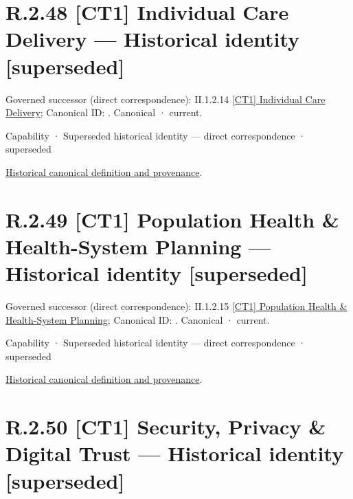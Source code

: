 \section*{R.2.48 [CT1] Individual Care Delivery — Historical identity [superseded]}
\label{navigation:R.2.48}

{\small Governed successor (direct correspondence): II.1.2.14 \hyperref[element:b964a11cde594318aa14ff935414158a]{[CT1] Individual Care Delivery}; Canonical ID: \texttt{}. Canonical · current.}\par
\label{element:162deb7e292042f78f677a14476a3a1d}
{\small Capability · Superseded historical identity — direct correspondence · superseded}\par
\href{../../../../continuum/strategy/capability/162deb7e292042f78f677a14476a3a1d.md}{Historical canonical definition and provenance}.\par
\section*{R.2.49 [CT1] Population Health \& Health-System Planning — Historical identity [superseded]}
\label{navigation:R.2.49}

{\small Governed successor (direct correspondence): II.1.2.15 \hyperref[element:c63b38b37e9b4e9b97dc87ed54604def]{[CT1] Population Health \& Health-System Planning}; Canonical ID: \texttt{}. Canonical · current.}\par
\label{element:a5003436a7f348b1bff60ba593adfa27}
{\small Capability · Superseded historical identity — direct correspondence · superseded}\par
\href{../../../../continuum/strategy/capability/a5003436a7f348b1bff60ba593adfa27.md}{Historical canonical definition and provenance}.\par
\section*{R.2.50 [CT1] Security, Privacy \& Digital Trust — Historical identity [superseded]}
\label{navigation:R.2.50}

